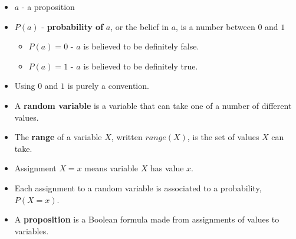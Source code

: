 \documentclass[12pt]{beamer} %
\begin{document}
\begin{slide}
\begin{itemize}
\item $a$ - a proposition
\item $P(a)$ - \textbf{probability of} $a$, or the belief in $a$, is a number between $0$ and $1$
\begin{itemize}
\item $P(a) = 0$ - $a$ is believed to be definitely false.
\item $P(a) = 1$ - $a$ is believed to be definitely true.
\end{itemize}
\item Using $0$ and $1$ is purely a convention.

\end{itemize}
\end{slide}
\begin{slide}
\begin{itemize}
\item
A \textbf{random variable} is a
variable that can take one of a number of different values.
\item The \textbf{range} of a variable $X$, written $range(X)$, is the
set of values $X$ can take.
\item Assignment \textbf{$X=x$} means
variable $X$ has value $x$.%
\item Each assignment to a random variable is associated to a probability, $P(X = x)$.
\item A \textbf{proposition} is a Boolean formula made from assignments of values to variables. 
\end{itemize}
\end{slide}
\end{document}

